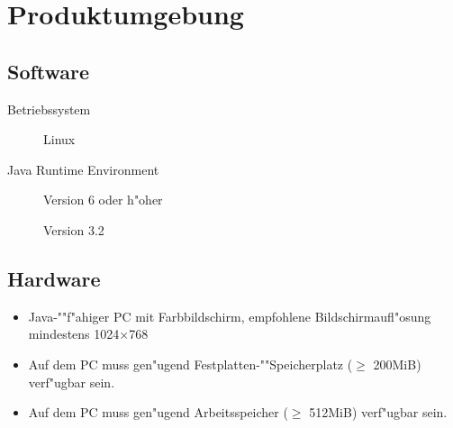 \section{Produktumgebung}%

\subsection{Software}%

\begin{description}%
    \item [Betriebssystem] Linux%
    \item [Java Runtime Environment] Version 6 oder h"oher
    \item [] Version 3.2%
\end{description}%

\subsection{Hardware}%


\begin{itemize}%
    \item Java-""f"ahiger PC mit Farbbildschirm, empfohlene Bildschirmaufl"osung mindestens 1024$\times$768%
    \item Auf dem PC muss gen"ugend Festplatten-""Speicherplatz ($\ge$ 200MiB) verf"ugbar sein.%
    \item Auf dem PC muss gen"ugend Arbeitsspeicher ($\ge$ 512MiB) verf"ugbar sein.%
\end{itemize}%
